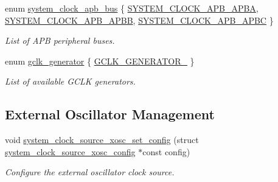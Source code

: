 \begin{DoxyCompactItemize}
enum \mbox{\hyperlink{group__asfdoc__sam0__system__clock__group_gac4ca1e52df2ab46c663dc51b51f9f2d5}{system\+\_\+clock\+\_\+apb\+\_\+bus}} \{ \mbox{\hyperlink{group__asfdoc__sam0__system__clock__group_ggac4ca1e52df2ab46c663dc51b51f9f2d5a25197a2c1efe6a444a5cdcef7d82a1de}{S\+Y\+S\+T\+E\+M\+\_\+\+C\+L\+O\+C\+K\+\_\+\+A\+P\+B\+\_\+\+A\+P\+BA}}, 
\mbox{\hyperlink{group__asfdoc__sam0__system__clock__group_ggac4ca1e52df2ab46c663dc51b51f9f2d5aa94daeca3198d35ba50839f69fa97fb2}{S\+Y\+S\+T\+E\+M\+\_\+\+C\+L\+O\+C\+K\+\_\+\+A\+P\+B\+\_\+\+A\+P\+BB}}, 
\mbox{\hyperlink{group__asfdoc__sam0__system__clock__group_ggac4ca1e52df2ab46c663dc51b51f9f2d5a53168b7d478e1634594203d1ec2a654a}{S\+Y\+S\+T\+E\+M\+\_\+\+C\+L\+O\+C\+K\+\_\+\+A\+P\+B\+\_\+\+A\+P\+BC}}
 \}
\begin{DoxyCompactList}\small\item\em List of A\+PB peripheral buses. \end{DoxyCompactList}\item 
enum \mbox{\hyperlink{group__asfdoc__sam0__system__clock__group_ga1ab9bb87560ad127ed982591b7d67311}{gclk\+\_\+generator}} \{ \mbox{\hyperlink{group__asfdoc__sam0__system__clock__group_gga1ab9bb87560ad127ed982591b7d67311a66f60c7b34b5fc16a9845d83370f7231}{G\+C\+L\+K\+\_\+\+G\+E\+N\+E\+R\+A\+T\+O\+R\+\_}}
 \}
\begin{DoxyCompactList}\small\item\em List of available G\+C\+LK generators. \end{DoxyCompactList}\end{DoxyCompactItemize}
\subsection*{External Oscillator Management}
\begin{DoxyCompactItemize}
\item 
void \mbox{\hyperlink{group__asfdoc__sam0__system__clock__group_gacd16e7e13de08d55c028620d845a5cb5}{system\+\_\+clock\+\_\+source\+\_\+xosc\+\_\+set\+\_\+config}} (struct \mbox{\hyperlink{structsystem__clock__source__xosc__config}{system\+\_\+clock\+\_\+source\+\_\+xosc\+\_\+config}} $\ast$const config)
\begin{DoxyCompactList}\small\item\em Configure the external oscillator clock source. \end{DoxyCompactList}\end{DoxyCompactItemize}
